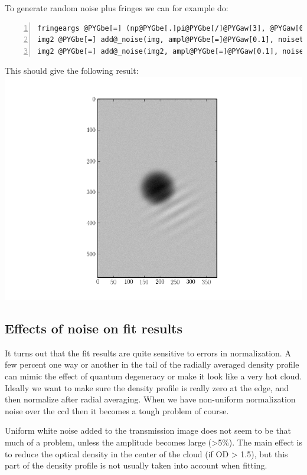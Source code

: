 \documentclass[letterpaper,10pt,english]{manual}
\begin{document}
To generate random noise plus fringes we can for example do:

\begin{Verbatim}[commandchars=@\[\],numbers=left,firstnumber=1,stepnumber=1]
fringeargs @PYGbe[=] (np@PYGbe[.]pi@PYGbe[/]@PYGaw[3], @PYGaw[0.03], (@PYGaw[60], @PYGaw[50]), @PYGaw[70])
img2 @PYGbe[=] add@_noise(img, ampl@PYGbe[=]@PYGaw[0.1], noisetype@PYGbe[=]@PYGad[']@PYGad[fringes]@PYGad['], fringeargs@PYGbe[=]fringeargs)
img2 @PYGbe[=] add@_noise(img2, ampl@PYGbe[=]@PYGaw[0.1], noisetype@PYGbe[=]@PYGad[']@PYGad[random]@PYGad['])
\end{Verbatim}

This should give the following result:
\includegraphics[width=400pt]{noisy_image.png}

\subsection{Effects of noise on fit results}

It turns out that the fit results are quite sensitive to errors in normalization. A few percent one way or another in the tail of the radially averaged density profile can mimic the effect of quantum degeneracy or make it look like a very hot cloud. Ideally we want to make sure the density profile is really zero at the edge, and then normalize after radial averaging. When we have non-uniform normalization noise over the ccd then it becomes a tough problem of course.

Uniform white noise added to the transmission image does not seem to be that much of a problem, unless the amplitude becomes large (\textgreater{}5\%). The main effect is to reduce the optical density in the center of the cloud (if OD \textgreater{} 1.5), but this part of the density profile is not usually taken into account when fitting.
\hypertarget{radialaveraging-label}{}
\end{document}
